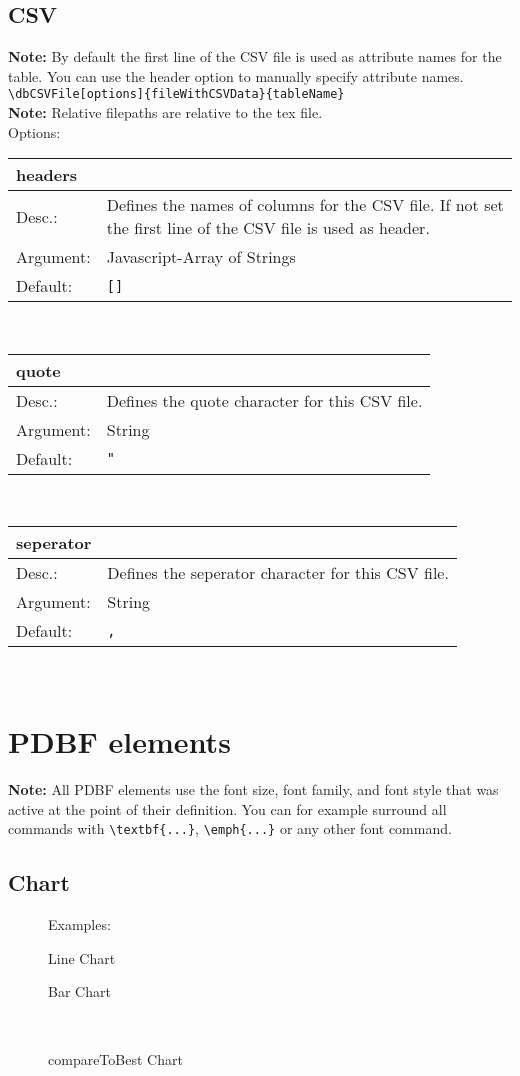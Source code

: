 \documentclass[11pt]{article}
\def\a{5cm}
\def\b{11.2cm}
\def\option#1#2#3#4{%
\noindent \begin{tabular}{|p{\a}|p{\b}|}
\hline
\textbf{#1} & \\
\hline
Desc.: & #2 \\
\hline
Argument: & #3\\
\hline
Default:& #4\\
\hline
\end{tabular} \\[4pt]%
}
\begin{document}
\subsection{CSV}
\textbf{Note:} By default the first line of the CSV file is used as attribute names for the table. You can use the header option to manually specify attribute names.\\[3pt]
\verb|\dbCSVFile[options]{fileWithCSVData}{tableName}| \\[8pt]
\textbf{Note:} Relative filepaths are relative to the tex file.\\[4pt]
\noindent Options:\\[3pt]
%
\option
{headers}
{Defines the names of columns for the CSV file. If not set the first line of the CSV file is used as header.}
{Javascript-Array of Strings}
{\texttt{[]}}

\option
{quote}
{Defines the quote character for this CSV file.}
{String}
{\texttt{"}}

\option
{seperator}
{Defines the seperator character for this CSV file.}
{String}
{\texttt{,}}

\newpage
\section{PDBF elements}
\textbf{Note:} All PDBF elements use the font size, font family, and font style that was active at the point of their definition. You can for example surround all commands with \verb|\textbf{...}|, \verb|\emph{...}| or any other font command.\\[3pt]
\subsection{Chart}
\begin{figure}[h!]%
\hspace{-218pt}Examples:\\
    \centering
    \begin{minipage}{.48\textwidth}
    \caption{Line Chart}
    \end{minipage}
    \hspace{11pt}
    \begin{minipage}{.48\textwidth}
    \caption{Bar Chart}
    \end{minipage} \\[8pt]
    \begin{minipage}{1.0\textwidth}
    \caption{compareToBest Chart}
    \end{minipage}
\end{figure}
\end{document}
